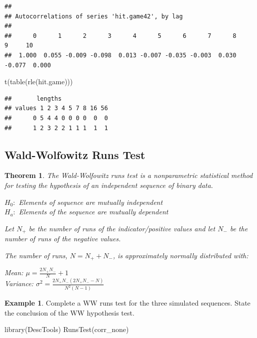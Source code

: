 \documentclass[
  11pt,
]{book}
\newenvironment{Shaded}{\begin{snugshade}}{\end{snugshade}}
\newcommand{\FunctionTok}[1]{\textcolor[rgb]{0.00,0.00,0.00}{#1}}
\newcommand{\NormalTok}[1]{#1}
\newtheorem{theorem}{Theorem}[chapter]
\theoremstyle{definition}
\theoremstyle{definition}
\newtheorem{example}{Example}[chapter]
\theoremstyle{definition}
\theoremstyle{definition}
\theoremstyle{remark}
\begin{document}
\begin{verbatim}
## 
## Autocorrelations of series 'hit.game42', by lag
## 
##      0      1      2      3      4      5      6      7      8      9     10 
##  1.000  0.055 -0.009 -0.098  0.013 -0.007 -0.035 -0.003  0.030 -0.077  0.000
\end{verbatim}

\begin{Shaded}
\begin{Highlighting}[]
\FunctionTok{t}\NormalTok{(}\FunctionTok{table}\NormalTok{(}\FunctionTok{rle}\NormalTok{(hit.game)))}
\end{Highlighting}
\end{Shaded}

\begin{verbatim}
##       lengths
## values 1 2 3 4 5 7 8 16 56
##      0 5 4 4 0 0 0 0  0  0
##      1 2 3 2 2 1 1 1  1  1
\end{verbatim}

\newpage

\hypertarget{wald-wolfowitz-runs-test}{%
\subsection{Wald-Wolfowitz Runs Test}\label{wald-wolfowitz-runs-test}}

\begin{theorem}
The Wald-Wolfowitz runs test is a nonparametric statistical method for testing the hypothesis of an independent sequence of binary data.

\(H_0:\) Elements of sequence are mutually independent\\
\(H_a:\) Elements of the sequence are mutually dependent

Let \(N_+\) be the number of runs of the indicator/positive values and let \(N_-\) be the number of runs of the negative values.

The number of runs, \(N = N_+ + N_-\), is approximately normally distributed with:

Mean: \(\mu=\frac{2N_+N_-}{N}+1\)\\
Variance: \(\sigma^2 = \frac{2N_+N_-(2N_+N_- - N)}{N^2(N-1)}\)
\end{theorem}

\begin{example}
Complete a WW runs test for the three simulated sequences. State the conclusion of the WW hypothesis test.
\end{example}

\begin{Shaded}
\begin{Highlighting}[]
\FunctionTok{library}\NormalTok{(DescTools)}
\FunctionTok{RunsTest}\NormalTok{(corr\_none)}
\end{Highlighting}
\end{Shaded}
\end{document}
